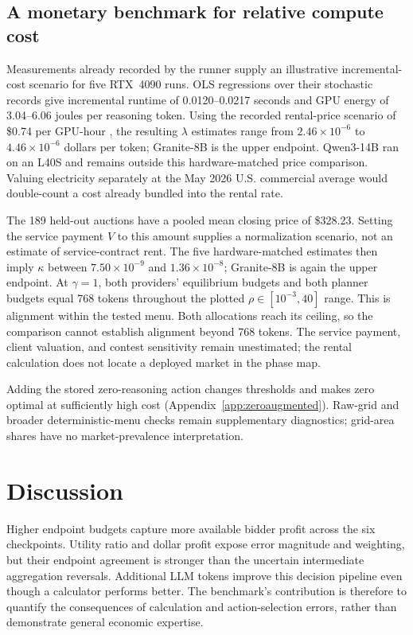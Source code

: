 \documentclass{article}
\begin{document}
\subsection{A monetary benchmark for relative compute cost}
\label{sec:monetarybenchmark}

Measurements already recorded by the runner supply an illustrative incremental-cost scenario for five RTX~4090 runs. OLS regressions over their stochastic records give incremental runtime of 0.0120--0.0217 seconds and GPU energy of 3.04--6.06 joules per reasoning token. Using the recorded rental-price scenario of \$0.74 per GPU-hour \citep{runpod2026pricing}, the resulting $\lambda$ estimates range from $2.46\times10^{-6}$ to $4.46\times10^{-6}$ dollars per token; Granite-8B is the upper endpoint. Qwen3-14B ran on an L40S and remains outside this hardware-matched price comparison. Valuing electricity separately at the May 2026 U.S. commercial average \citep{eia2026electricity} would double-count a cost already bundled into the rental rate.

The 189 held-out auctions have a pooled mean closing price of \$328.23. Setting the service payment $V$ to this amount supplies a normalization scenario, not an estimate of service-contract rent. The five hardware-matched estimates then imply $\kappa$ between $7.50\times10^{-9}$ and $1.36\times10^{-8}$; Granite-8B is again the upper endpoint. At $\gamma=1$, both providers' equilibrium budgets and both planner budgets equal 768 tokens throughout the plotted $\rho\in[10^{-3},40]$ range. This is alignment within the tested menu. Both allocations reach its ceiling, so the comparison cannot establish alignment beyond 768 tokens. The service payment, client valuation, and contest sensitivity remain unestimated; the rental calculation does not locate a deployed market in the phase map.

Adding the stored zero-reasoning action changes thresholds and makes zero optimal at sufficiently high cost (Appendix~\ref{app:zeroaugmented}). Raw-grid and broader deterministic-menu checks remain supplementary diagnostics; grid-area shares have no market-prevalence interpretation.

\section{Discussion}

Higher endpoint budgets capture more available bidder profit across the six checkpoints. Utility ratio and dollar profit expose error magnitude and weighting, but their endpoint agreement is stronger than the uncertain intermediate aggregation reversals. Additional LLM tokens improve this decision pipeline even though a calculator performs better. The benchmark's contribution is therefore to quantify the consequences of calculation and action-selection errors, rather than demonstrate general economic expertise.
\end{document}
